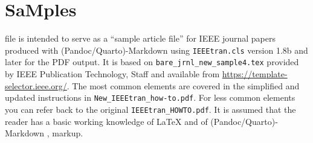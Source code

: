 \documentclass[
  journal,
]{IEEEtran}%
\begin{document}
\begin{table}

\caption{\label{tbl-panel}Main Caption}

\begin{minipage}[t]{0.50\linewidth}



\end{minipage}%
%
\begin{minipage}[t]{0.50\linewidth}



\end{minipage}%

\end{table}%

\section{SaMples}\label{samples}

file is intended to serve as a ``sample article file'' for IEEE journal
papers produced with (Pandoc/Quarto)-Markdown using
\texttt{IEEEtran.cls} version 1.8b and later for the PDF output. It is
based on \texttt{bare\_jrnl\_new\_sample4.tex} provided by IEEE
Publication Technology, Staff and available from
\url{https://template-selector.ieee.org/}. The most common elements are
covered in the simplified and updated instructions in
\texttt{New\_IEEEtran\_how-to.pdf}. For less common elements you can
refer back to the original \texttt{IEEEtran\_HOWTO.pdf}. It is assumed
that the reader has a basic working knowledge of {\LaTeX}
 and of
(Pandoc/Quarto)-Markdown ,
 markup.
\end{document}
